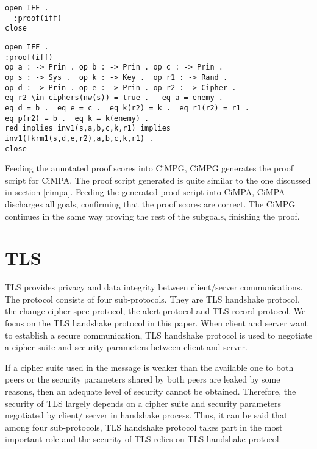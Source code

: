 \documentclass[a4paper,fleqn]{cas-dc}
\begin{document}
\begin{small}
		\noindent
		\verb!open IFF .!\\
		\verb!  :proof(iff)!\\
		\verb!close!
		\smallskip
\end{small}
\noindent
\begin{small}
\begin{verbatim}
open IFF .
:proof(iff)
op a : -> Prin . op b : -> Prin . op c : -> Prin .
op s : -> Sys .  op k : -> Key .  op r1 : -> Rand .
op d : -> Prin . op e : -> Prin . op r2 : -> Cipher .
eq r2 \in ciphers(nw(s)) = true .   eq a = enemy .
eq d = b .  eq e = c .  eq k(r2) = k .  eq r1(r2) = r1 .    
eq p(r2) = b .  eq k = k(enemy) .
red implies inv1(s,a,b,c,k,r1) implies
inv1(fkrm1(s,d,e,r2),a,b,c,k,r1) .
close
\end{verbatim}
\end{small}
Feeding the annotated proof scores into CiMPG, CiMPG generates the proof script for CiMPA. The proof script generated is quite similar to the one discussed in section \ref{cimpa}. Feeding the generated proof script into CiMPA, CiMPA discharges all goals, confirming that the proof scores are correct. The CiMPG continues in the same way proving the rest of the subgoals, finishing the
proof.

\section{TLS}\label{tls}
TLS \cite{dierk} provides privacy and data integrity between client/server communications. The protocol consists of four sub-protocols. They are TLS handshake protocol, the change cipher spec protocol, the alert protocol and TLS record protocol. We focus on the TLS handshake protocol in this paper. When client and server want to establish a secure communication, TLS handshake protocol is used to negotiate a cipher suite and security parameters between client and server. 


If a cipher suite used in the message is weaker than the available one to both peers or the security parameters shared by both peers are leaked by some reasons, then an adequate level of security cannot be obtained. Therefore, the security of TLS largely depends on a cipher suite and security parameters negotiated by client/ server in handshake process. Thus, it can be said that among four sub-protocols, TLS handshake protocol takes part in the most important role and the security of TLS relies on TLS handshake protocol. 
\end{document}
